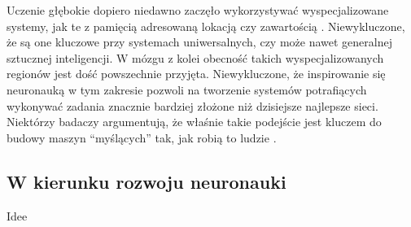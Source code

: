 Uczenie głębokie dopiero niedawno zaczęło wykorzystywać wyspecjalizowane systemy, jak te z pamięcią adresowaną lokacją czy zawartością \cite{graves2014neural}.
Niewykluczone, że są one kluczowe przy systemach uniwersalnych, czy może nawet generalnej sztucznej inteligencji.
W mózgu z kolei obecność takich wyspecjalizowanych regionów jest dość powszechnie przyjęta.
Niewykluczone, że inspirowanie się neuronauką w tym zakresie pozwoli na tworzenie systemów potrafiących wykonywać zadania znacznie bardziej złożone niż dzisiejsze najlepsze sieci.
Niektórzy badaczy argumentują, że właśnie takie podejście jest kluczem do budowy maszyn ``myślących'' tak, jak robią to ludzie \cite{lake2017building}.

\subsection{W kierunku rozwoju neuronauki}

Idee 
